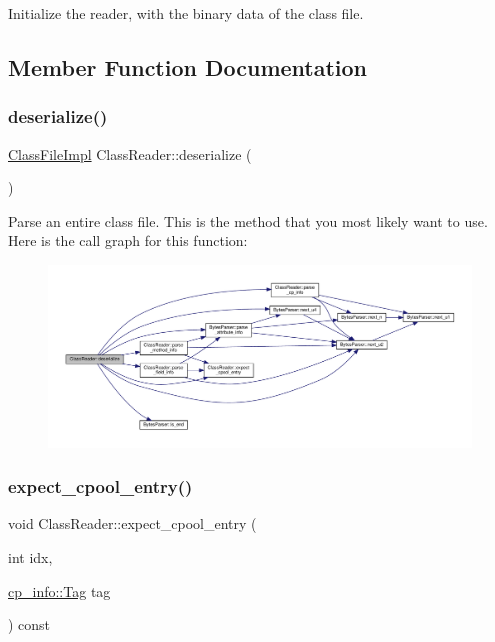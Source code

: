 Initialize the reader, with the binary {\ttfamily data} of the class file. 



\subsection{Member Function Documentation}
\mbox{\label{classClassReader_a001cc48324c31430559b43976d731e8a}} 
\subsubsection{\texorpdfstring{deserialize()}{deserialize()}}
{\footnotesize\ttfamily \hyperlink{classClassFileImpl}{Class\+File\+Impl} Class\+Reader\+::deserialize (\begin{DoxyParamCaption}{ }\end{DoxyParamCaption})}

Parse an entire class file. This is the method that you most likely want to use. Here is the call graph for this function\+:\nopagebreak
\begin{figure}[H]
\begin{center}
\leavevmode
\includegraphics[width=350pt]{classClassReader_a001cc48324c31430559b43976d731e8a_cgraph}
\end{center}
\end{figure}
\mbox{\label{classClassReader_a7f8a951758bdb961ebf36088301ac1b4}} 
\subsubsection{\texorpdfstring{expect\+\_\+cpool\+\_\+entry()}{expect\_cpool\_entry()}}
{\footnotesize\ttfamily void Class\+Reader\+::expect\+\_\+cpool\+\_\+entry (\begin{DoxyParamCaption}\item[{int}]{idx,  }\item[{\hyperlink{structcp__info_acdef8472ed83e12e3a87bca8d6001f69}{cp\+\_\+info\+::\+Tag}}]{tag }\end{DoxyParamCaption}) const\hspace{0.3cm}{\ttfamily [private]}}

